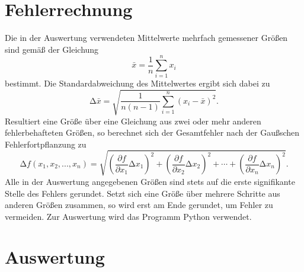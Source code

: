 \documentclass[
  bibliography=totoc,     %
  captions=tableheading,  %
  titlepage=firstiscover, %
]{scrartcl}
\begin{document}
\section{Fehlerrechnung}
\label{sec:fehlerrechnung}
Die in der Auswertung verwendeten Mittelwerte mehrfach gemessener Größen sind
gemäß der Gleichung
\begin{equation}
    \bar{x}=\frac{1}{n}\sum_{i=1}^n x_i
    \label{eqn:mittelwert}
\end{equation}
bestimmt. Die Standardabweichung des Mittelwertes ergibt sich dabei zu
\begin{equation}
    \mathup{\Delta}\bar{x}=\sqrt{\frac{1}{n(n-1)}\sum_{i=1}^n\left(x_i-\bar{x}\right)^2}.
    \label{eqn:standardabweichung}
\end{equation}
Resultiert eine Größe über eine Gleichung aus zwei oder mehr anderen
fehlerbehafteten Größen, so berechnet sich der Gesamtfehler nach der
Gaußschen Fehlerfortpflanzung zu
\begin{equation}
    \mathup{\Delta}f(x_1,x_2,...,x_n)=\sqrt{\left(\frac{\partial f}{\partial x_1}\mathup{\Delta}x_1\right)^2+\left(\frac{\partial f}{\partial x_2}\mathup{\Delta}x_2\right)^2+ \dotsb +\left(\frac{\partial f}{\partial x_n}\mathup{\Delta}x_n\right)^2}.
    \label{eqn:fehlerfortpflanzung}
\end{equation}
Alle in der Auswertung angegebenen Größen sind stets auf die erste signifikante
Stelle des Fehlers gerundet. Setzt sich eine Größe über mehrere Schritte aus
anderen Größen zusammen, so wird erst am Ende gerundet, um Fehler zu vermeiden.
Zur Auswertung wird das Programm Python verwendet.
\clearpage
\section{Auswertung}
\label{sec:auswertung}
\end{document}
